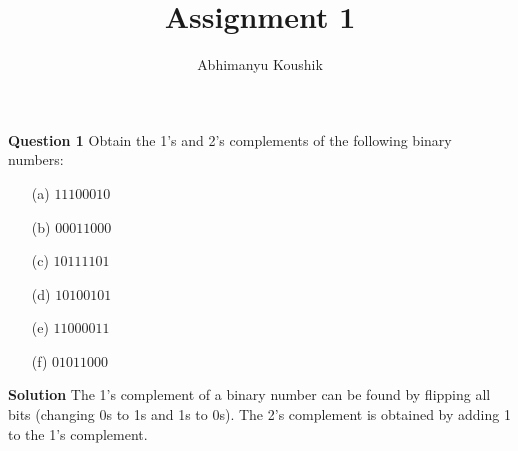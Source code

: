 \documentclass{article}
\title{Assignment 1}
\author{Abhimanyu Koushik}
\begin{document}
\maketitle

\textbf{Question 1}\newline
Obtain the 1's and 2's complements of the following binary numbers:
\begin{enumerate}
    \item[(a)] \(11100010\)
    \item[(b)] \(00011000\)
    \item[(c)] \(10111101\)
    \item[(d)] \(10100101\)
    \item[(e)] \(11000011\)
    \item[(f)] \(01011000\)
\end{enumerate}

\textbf{Solution}\newline
The 1's complement of a binary number can be found by flipping all bits (changing 0s to 1s and 1s to 0s). The 2's complement is obtained by adding 1 to the 1's complement.
\end{document}
